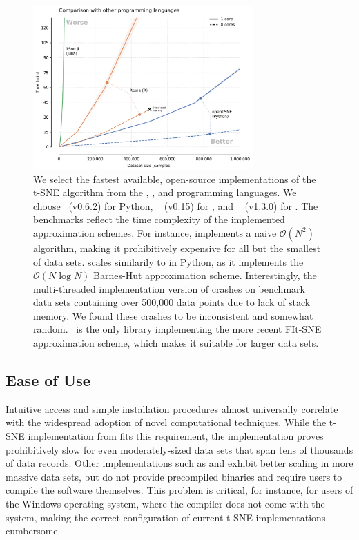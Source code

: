 \documentclass[article]{jss}
\newcommand{\opentsne}{\pkg{openTSNE}}
\begin{document}
\begin{figure}[ht]
  \centering
  \includegraphics[width=0.75\textwidth]{benchmarks_langs-final}
  \caption{\label{fig:benchmarks_lang}
  We select the fastest available, open-source implementations of the t-SNE
  algorithm from the , , and 
  programming languages. We choose
  \opentsne\ (v0.6.2) for Python, ~\citep{krijthe2015rtsne} (v0.15)
  for , and ~\citep{julia_tsne} (v1.3.0) for
  . The benchmarks reflect the time complexity of the
  implemented approximation schemes. For instance,  implements a
  naive $\mathcal{O}(N^2)$ algorithm, making it prohibitively expensive for all
  but the smallest of data sets.  scales similarily to
   in Python, as it implements the $\mathcal{O}(N \log N)$
  Barnes-Hut approximation scheme. Interestingly, the multi-threaded
  implementation version of  crashes on benchmark data sets
  containing over 500,000 data points due to lack of stack memory. We found
  these crashes to be inconsistent and somewhat random. \opentsne\ is the only
  library implementing the more recent FIt-SNE approximation scheme, which makes
  it suitable for larger data sets.
}
\end{figure}

\subsection{Ease of Use}

Intuitive access and simple installation procedures almost universally correlate
with the widespread adoption of novel computational techniques. While the t-SNE
implementation from  fits this requirement, the implementation
proves prohibitively slow for even moderately-sized data sets that span tens of
thousands of data records. Other  implementations such as 
and  exhibit better scaling in more massive data sets, but do not
provide precompiled binaries and require users to compile the software
themselves. This problem is critical, for instance, for users of the Windows
operating system, where the  compiler does not come with the system, making
the correct configuration of current t-SNE implementations cumbersome.
\end{document}
